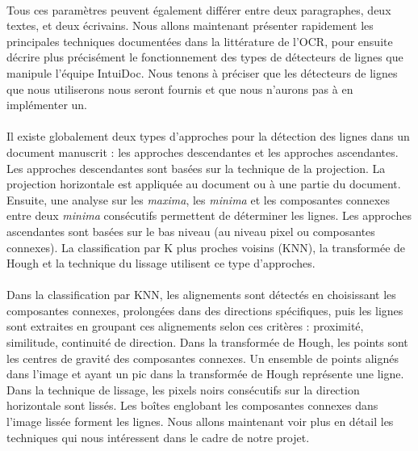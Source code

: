 \paragraph{}
Tous ces paramètres peuvent également différer entre deux paragraphes, deux textes, et deux écrivains. Nous allons maintenant
présenter rapidement les principales techniques documentées dans la littérature de l'OCR, pour ensuite décrire plus
précisément le fonctionnement des types de détecteurs de lignes que manipule l'équipe IntuiDoc. Nous tenons à préciser que
les détecteurs de lignes que nous utiliserons nous seront fournis et que nous n'aurons pas à en implémenter un.

\paragraph{}
Il existe globalement deux types d'approches pour la détection des lignes dans un document manuscrit : les approches
descendantes et les approches ascendantes. Les approches descendantes sont basées sur la technique de la projection.
La projection horizontale est appliquée au document ou à une partie du document. Ensuite, une analyse sur les \textit{maxima},
les \textit{minima} et les composantes connexes entre deux \textit{minima} consécutifs permettent de déterminer les lignes.
Les approches ascendantes sont basées sur le bas niveau (au niveau pixel ou composantes connexes). La classification
par K plus proches voisins (KNN), la transformée de Hough et la technique du lissage utilisent ce type d'approches.

\paragraph{}
Dans la classification par KNN, les alignements sont détectés en choisissant les composantes connexes, prolongées dans des
directions spécifiques, puis les lignes sont extraites en groupant ces alignements selon ces critères : proximité, similitude,
continuité de direction. Dans la transformée de Hough, les points sont les centres de gravité des composantes connexes.
Un ensemble de points alignés dans l'image et ayant un pic dans la transformée de Hough représente une ligne. Dans la technique
de lissage, les pixels noirs consécutifs sur la direction horizontale sont lissés. Les boîtes englobant les composantes connexes
dans l'image lissée forment les lignes. Nous allons maintenant voir plus en détail les techniques qui nous intéressent
dans le cadre de notre projet.

